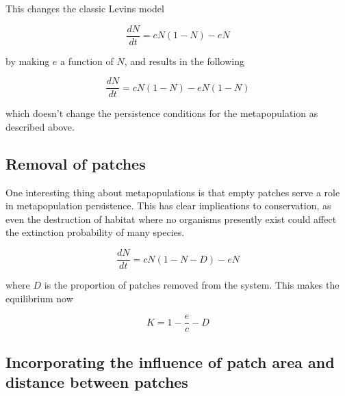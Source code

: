 \documentclass[12pt]{article}
\begin{document}
This changes the classic Levins model

\begin{equation}
\frac{dN}{dt} = cN(1-N) - eN
\end{equation}

by making $e$ a function of $N$, and results in the following

\begin{equation}
\frac{dN}{dt} = cN(1-N) - eN(1-N)
\end{equation}

which doesn't change the persistence conditions for the metapopulation as described above.















\bigskip

\subsection*{Removal of patches}

One interesting thing about metapopulations is that empty patches serve a role in metapopulation persistence. This has clear implications to conservation, as even the destruction of habitat where no organisms presently exist could affect the extinction probability of many species.


\begin{equation}
\frac{dN}{dt} = cN(1-N-D) - eN
\end{equation}

where $D$ is the proportion of patches removed from the system. This makes the equilibrium now

\begin{equation}
K = 1 - \frac{e}{c} - D
\end{equation}




















\bigskip

\subsection*{Incorporating the influence of patch area and distance between patches}
\end{document}
